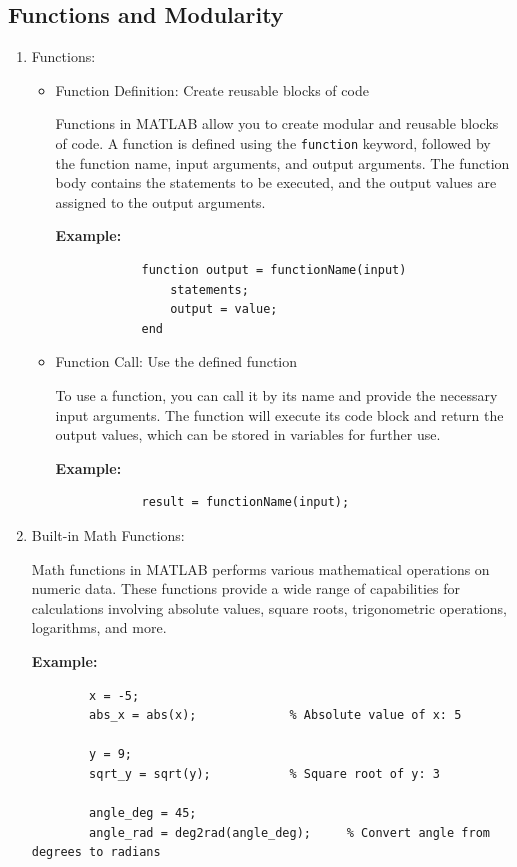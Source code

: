 \documentclass[
11pt, %
a4paper, %
oneside, %
headinclude,footinclude, %
BCOR5mm, %
]{scrartcl}
\begin{document}
\subsection{Functions and Modularity}
\begin{enumerate}
	\item Functions:
	\begin{itemize}
		\item Function Definition: Create reusable blocks of code
		
		Functions in MATLAB allow you to create modular and reusable blocks of code. A function is defined using the \texttt{function} keyword, followed by the function name, input arguments, and output arguments. The function body contains the statements to be executed, and the output values are assigned to the output arguments.
		
		\textbf{Example:}
		\begin{verbatim}
			function output = functionName(input)
			    statements;
			    output = value;
			end
		\end{verbatim}
		
		\item Function Call: Use the defined function
		
		To use a function, you can call it by its name and provide the necessary input arguments. The function will execute its code block and return the output values, which can be stored in variables for further use.
		
		\textbf{Example:}
		\begin{verbatim}
			result = functionName(input);
		\end{verbatim}
	\end{itemize}
	
	\item Built-in Math Functions:
	
	Math functions in MATLAB performs various mathematical operations on numeric data. These functions provide a wide range of capabilities for calculations involving absolute values, square roots, trigonometric operations, logarithms, and more\cite{MathWorks}.
	
	\textbf{Example:}
	\begin{verbatim}
		x = -5;
		abs_x = abs(x);             % Absolute value of x: 5
		
		y = 9;
		sqrt_y = sqrt(y);           % Square root of y: 3
		
		angle_deg = 45;
		angle_rad = deg2rad(angle_deg);     % Convert angle from degrees to radians
		

\end{verbatim}
\end{enumerate}
\end{document}
